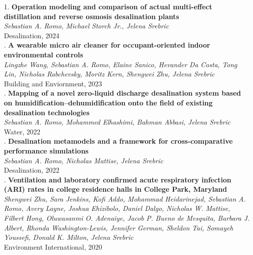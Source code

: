 1. \textbf{Operation modeling and comparison of actual multi-effect distillation and reverse osmosis desalination plants}\\\n   \textit{Sebastian A. Romo, Michael Storch Jr., Jelena Srebric}\\\n   Desalination, 2024\\\n\vspace{0.3em}. \textbf{A wearable micro air cleaner for occupant-oriented indoor environmental controls}\\\n   \textit{Lingzhe Wang, Sebastian A. Romo, Elaine Sanico, Hevander Da Costa, Tong Lin, Nicholas Rabchevsky, Moritz Kern, Shengwei Zhu, Jelena Srebric}\\\n   Building and Enviornment, 2023\\\n\vspace{0.3em}. \textbf{Mapping of a novel zero-liquid discharge desalination system based on humidification–dehumidification onto the field of existing desalination technologies}\\\n   \textit{Sebastian A. Romo, Mohammed Elhashimi, Bahman Abbasi, Jelena Srebric}\\\n   Water, 2022\\\n\vspace{0.3em}. \textbf{Desalination metamodels and a framework for cross-comparative performance simulations}\\\n   \textit{Sebastian A. Romo, Nicholas Mattise, Jelena Srebric}\\\n   Desalination, 2022\\\n\vspace{0.3em}. \textbf{Ventilation and laboratory confirmed acute respiratory infection (ARI) rates in college residence halls in College Park, Maryland}\\\n   \textit{Shengwei Zhu, Sara Jenkins, Kofi Addo, Mohammad Heidarinejad, Sebastian A. Romo, Avery Layne, Joshua Ehizibolo, Daniel Dalgo, Nicholas W. Mattise, Filbert Hong, Oluwasanmi O. Adenaiye, Jacob P. Bueno de Mesquita, Barbara J. Albert, Rhonda Washington-Lewis, Jennifer German, Sheldon Tai, Somayeh Youssefi, Donald K. Milton, Jelena Srebric}\\\n   Environment International, 2020\\\n\vspace{0.3em}\n